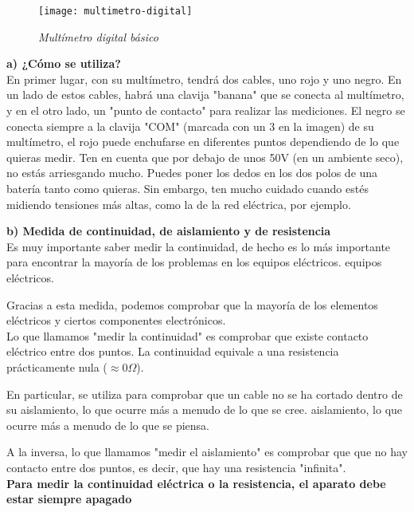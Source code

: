 \begin{figure}[h]
\texttt{[image: multimetro-digital]} 
\centering
\caption*{\textit{Multímetro digital básico}}
\end{figure}
\textbf{a) ¿Cómo se utiliza?}\\

En primer lugar, con su multímetro, tendrá dos cables, uno rojo y uno negro. En un lado de estos cables, habrá una clavija "banana" que se conecta al multímetro, y en el otro lado, un "punto de contacto" para realizar las mediciones.
El negro se conecta siempre a la clavija "COM" (marcada con un 3 en la imagen) de su multímetro, el rojo puede enchufarse en diferentes puntos dependiendo de lo que quieras medir.
Ten en cuenta que por debajo de unos 50V (en un ambiente seco), no estás arriesgando mucho.
Puedes poner los dedos en los dos polos de una batería tanto como quieras. Sin embargo, ten mucho cuidado cuando estés midiendo tensiones más altas, como la de la red eléctrica, por ejemplo.

\newpage

\textbf{b) Medida de continuidad, de aislamiento y de resistencia}\\

Es muy importante saber medir la continuidad, de hecho es lo más importante
para encontrar la mayoría de los problemas en los equipos eléctricos.
equipos eléctricos.

Gracias a esta medida, podemos comprobar que la mayoría de los elementos eléctricos y ciertos componentes electrónicos.\\

Lo que llamamos "medir la continuidad" es comprobar que existe contacto eléctrico entre dos puntos.
La continuidad equivale a una resistencia prácticamente nula ($\approx$0$\Omega$).

En particular, se utiliza para comprobar que un cable no se ha cortado dentro de su aislamiento, lo que ocurre más a menudo de lo que se cree.
aislamiento, lo que ocurre más a menudo de lo que se piensa.

A la inversa, lo que llamamos "medir el aislamiento" es comprobar que
que no hay contacto entre dos puntos, es decir, que hay una resistencia "infinita".\\

\textbf{
Para medir la continuidad eléctrica o la resistencia, el aparato debe
estar siempre apagado}\\

